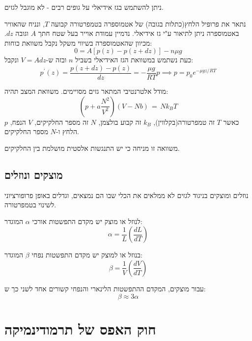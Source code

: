 \documentclass{tstextbook}
\begin{document}
ניתן להשתמש בגז אידיאלי על גופים רבים - לא מוגבל לגזים. 

\begin{example}
נתאר את פרופיל הלחץ(כתלות בגובה) של אטמוספרה בטמפרטורה קבועה \(T\), ונניח שהאוויר באטמוספרה ניתן לתיאור ע"י גז אידיאלי.
נדמיין עמודת אוייר בעל שטח חתך \(A\) וגובה \(dz\). מכיוון שהאטמוספרה בשיווי משקל נקבל משוואת כוחות:
$$0=A\left[p\left(z\right)-p\left(z+d z\right)\right]-n\mu g$$
כעת נשתמש במשוואת הגז האידיאלי בשביל \(n\) ובזה ש-\(V=Adz\) ונקבל:
$$p^{\prime}\left(z\right)=\frac{p\left(z+d z\right)-p\left(z\right)}{d z}=-\frac{\mu g}{R T}p\implies p=p_{0}e^{-\mu gz/RT}$$

\end{example}
\begin{definition}
מודל אלטרנטיבי המתאר גזים מסויימים. משוואת המצב תהיה:
$$\left(p+a\frac{N^{2}}{V^{2}}\right)\left(V-N b\right)\,=\,N k_{B}T$$
כאשר \(T\) זה טמפרטורה(בקלווין), \(k_{B}\) זה קבוע בולצמן, \(N\) זה מספר החלקיקים, \(V\) הנפח, \(p\) הלחץ ו-\(N\) מספר החלקיקים.

\end{definition}
משוואה זו מניחה כי יש התנגשות אלסטית מושלמת בין החלקיקים.

\subsection{מוצקים ונוזלים}

נוזלים ומוצקים בניגוד לגזים לא ממלאים את הכלי שבו הם נמצאים, וגדלים באופן פרופורציוני לשינוי בטמפרטורה.

\begin{definition}
לנוזל או מוצק יש מקדם התפשטות אורכי \(\alpha\) המוגדר:
$$\alpha\!=\!{\frac{1}{L}}\!\left({\frac{d L}{d T}}\right)$$

\end{definition}
\begin{definition}
בנוזל או למוצק יש מקדם התפשטות נפחי \(\beta\) המוגדר:
$$\beta\!=\!{\frac{1}{V}}\!\left({\frac{d V}{d T}}\right)$$

\end{definition}
\begin{proposition}
עבור מוצקים, המקדם ההתפשטות הלינארי והנפחי קשורים אחד לשני כך ש:
$${\beta}\approx 3\alpha$$

\end{proposition}
\section{חוק האפס של תרמודינמיקה}
\end{document}
